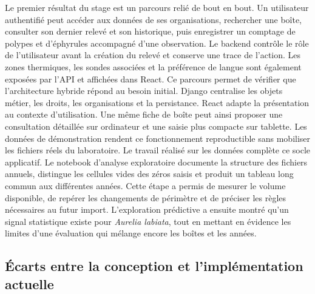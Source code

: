 \documentclass{article}
\begin{document}
Le premier résultat du stage est un parcours relié de bout en bout. Un utilisateur authentifié peut accéder aux données de ses organisations, rechercher une boîte, consulter son dernier relevé et son historique, puis enregistrer un comptage de polypes et d’éphyrules accompagné d’une observation. Le backend contrôle le rôle de l’utilisateur avant la création du relevé et conserve une trace de l’action. Les zones thermiques, les sondes associées et la préférence de langue sont également exposées par l’API et affichées dans React.
Ce parcours permet de vérifier que l’architecture hybride répond au besoin initial. Django centralise les objets métier, les droits, les organisations et la persistance. React adapte la présentation au contexte d’utilisation. Une même fiche de boîte peut ainsi proposer une consultation détaillée sur ordinateur et une saisie plus compacte sur tablette. Les données de démonstration rendent ce fonctionnement reproductible sans mobiliser les fichiers réels du laboratoire.
Le travail réalisé sur les données complète ce socle applicatif. Le notebook d’analyse exploratoire documente la structure des fichiers annuels, distingue les cellules vides des zéros saisis et produit un tableau long commun aux différentes années. Cette étape a permis de mesurer le volume disponible, de repérer les changements de périmètre et de préciser les règles nécessaires au futur import. L’exploration prédictive a ensuite montré qu’un signal statistique existe pour \textit{Aurelia labiata}, tout en mettant en évidence les limites d’une évaluation qui mélange encore les boîtes et les années.

\subsection{Écarts entre la conception et l’implémentation actuelle}
\end{document}
